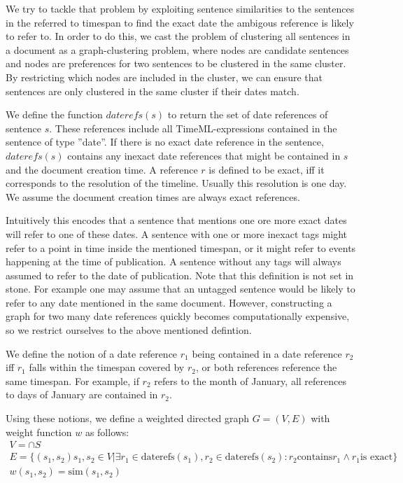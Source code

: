 \documentclass[a4paper,BCOR=10mm]{report}
\begin{document}
We try to tackle that problem by exploiting sentence similarities to the sentences in the referred to timespan to find the exact date the ambigous reference is likely to refer to. In order to do this, we cast the problem of clustering all sentences in a document as a graph-clustering problem, where nodes are candidate sentences and nodes are preferences for two sentences to be clustered in the same cluster. By restricting which nodes are included in the cluster, we can ensure that sentences are only clustered in the same cluster if their dates match.

We define the function $daterefs(s)$ to return the set of date references of sentence $s$. These references include all TimeML-expressions contained in the sentence of type ''date''. If there is no exact date reference in the sentence, $daterefs(s)$ contains any inexact date references that might be contained in $s$ and the document creation time.
A reference $r$ is defined to be exact, iff it corresponds to the resolution of the timeline. Usually this resolution is one day. We assume the document creation times are always exact references.

Intuitively this encodes that a sentence that mentions one ore more exact dates will refer to one of these dates. A sentence with one or more inexact tags might refer to a point in time inside the mentioned timespan, or it might refer to events happening at the time of publication. A sentence without any tags will always assumed to refer to the date of publication.
Note that this definition is not set in stone. For example one may assume that an untagged sentence would be likely to refer to any date mentioned in the same document. However, constructing a graph for two many date references quickly becomes computationally expensive, so we restrict ourselves to the above mentioned defintion.

We define the notion of a date reference $r_1$ being contained in a date reference $r_2$ iff $r_1$ falls within the timespan covered by $r_2$, or both references reference the same timespan. For example, if $r_2$ refers to the month of January, all references to days of January are contained in $r_2$.

Using these notions, we define a weighted directed graph $G = (V, E)$ with weight function $w$ as follows:
\begin{align*}
V = \cap{S} \\
E = \{ (s_1, s_2) s_1, s_2 \in V | \exists r_1 \in \text{daterefs}(s_1), r_2 \in \text{daterefs}(s_2): r_2 \text{contains} r_1 \land r_1 \text{is exact} \} \\ %
w(s_1, s_2) = \text{sim}(s_1, s_2)
\end{align*}
\end{document}
